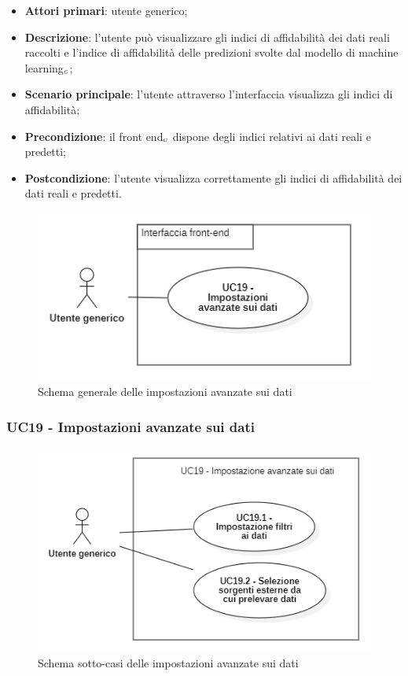 \begin{itemize}
	\item \textbf{Attori primari}: utente generico;
	\item \textbf{Descrizione}: l'utente può visualizzare gli indici di affidabilità dei dati reali raccolti e l'indice di affidabilità delle predizioni svolte dal modello di machine learning$_{\scaleto{G}{3pt}}$;
	\item \textbf{Scenario principale}: l'utente attraverso l'interfaccia visualizza gli indici di affidabilità;
	\item \textbf{Precondizione}: il front end$_{\scaleto{G}{3pt}}$ dispone degli indici relativi ai dati reali e predetti;
	\item \textbf{Postcondizione}: l'utente visualizza correttamente gli indici di affidabilità dei dati reali e predetti.
\end{itemize}
\begin{center}
	\begin{figure}[H]
		\centering\includegraphics[scale=0.8]{../immagini/attori_casi/UC_19.png}
		\caption{Schema generale delle impostazioni avanzate sui dati}
	\end{figure}
\end{center}
\subsubsection{UC19 - Impostazioni avanzate sui dati}\label{CasiDUsoCasiDUsoFacoltativiTraUnUtenteEIlFrontEndElencoCasiDUsoUC11ImpostazioniAvanzateSuiDati}

\begin{center}
	\begin{figure}[H]
		\centering\includegraphics[scale=0.7]{../immagini/attori_casi/UC_19_1_2.png}
		\caption{Schema sotto-casi delle impostazioni avanzate sui dati}
	\end{figure}
\end{center}

